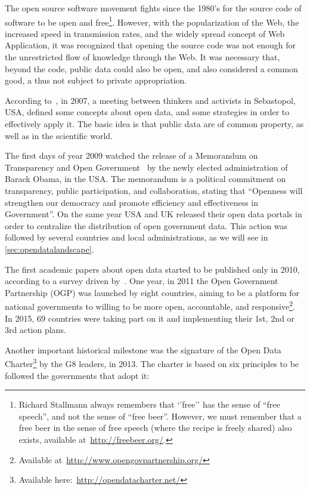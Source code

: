 The open source software movement fights since the 1980's for the source code of software to be open and free\footnote{Richard Stallmann always remembers that `'free'' has the sense of ``free speech'', and not the sense of ``free beer''. However, we must remember that a free beer in the sense of free speech (where the recipe is freely shared) also exists, available at~\url{http://freebeer.org/}.}.
However, with the popularization of the Web, the increased speed in transmission rates, and the widely spread concept of Web Application, it was recognized that opening the source code was not enough for the unrestricted flow of knowledge through the Web.
It was necessary that, beyond the code, public data could also be open, and also considered a common good, a thus not subject to private appropriation.

According to~, in 2007, a meeting between thinkers and activists in Sebastopol, USA, defined some concepts about open data, and some strategies in order to effectively apply it.
The basic idea is that public data are of common property, as well as in the scientific world.

The first days of year 2009 watched the release of a Memorandum on Transparency and Open Government~\cite{Obama2009} by the newly elected administration of Barack Obama, in the USA.
The memorandum is a political commitment on transparency, public participation, and collaboration, stating that ``Openness will strengthen our democracy and promote efficiency and effectiveness in Government''.
On the same year USA and UK released their open data portals in order to centralize the distribution of open government data.
This action was followed by several countries and local administrations, as we will see in \autoref{sec:opendatalandscape}. 

The first academic papers about open data started to be published only in 2010, according to a survey driven by~. One year, in 2011 the Open Government Partnership (OGP) was launched by eight countries, aiming to be a platform for national governments to willing to be more open, accountable, and responsive\footnote{Available at~\url{http://www.opengovpartnership.org/}}. In 2015, 69 countries were taking part on it and implementing their 1st, 2nd or 3rd action plans.

Another important historical milestone was the signature of the Open Data Charter\footnote{Available here:~\url{http://opendatacharter.net/}} by the G8 leaders, in 2013. The charter is based on six principles to be followed the governments that adopt it:

